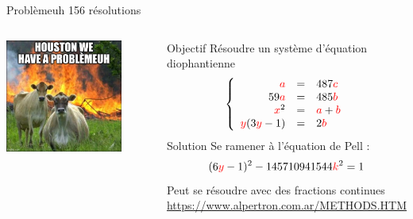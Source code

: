 \begin{frame}{Problèmeuh \FiveStar \FiveStar \hfill 156 résolutions}
    \begin{columns}[c]
        \begin{center}                  
            \includegraphics[width=0.8\textwidth]{img/meme/problemeuh-intro.png}
        \end{center}

           \begin{outline}
               \1 Objectif
                \2 Résoudre un système d'équation diophantienne
                \[\left\{
                    \begin{array}{r c l}
                        \textcolor{red}{a} &=&  487 \textcolor{red}{c} \\
                        59\textcolor{red}{a} &=& 485 \textcolor{red}{b} \\
                        \textcolor{red}{x} ^ 2 &=& \textcolor{red}{a} + \textcolor{red}{b} \\
                        \textcolor{red}{y} (3 \textcolor{red}{y} - 1) &=& 2 \textcolor{red}{b} \\
                    \end{array}
                \right.\]
               \1 Solution
                \2 Se ramener à l'équation de Pell :
                 \[(6\textcolor{red}{y} - 1)^2 - 145710941544 \textcolor{red}{k}^2 = 1\]
               \1 Peut se résoudre avec des fractions continues
               \1 \url{https://www.alpertron.com.ar/METHODS.HTM} \flag{}
           \end{outline}
    \end{columns}
\end{frame}

